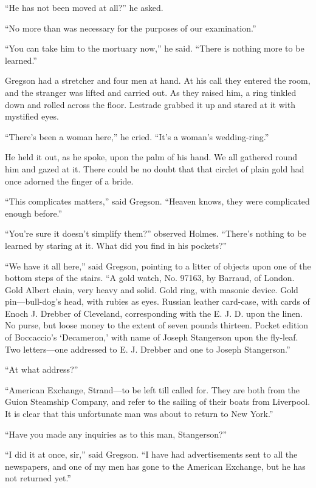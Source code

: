 \documentclass[12pt]{book}
\begin{document}
“He has not been moved at all?” he asked. 

“No more than was necessary for the purposes of our examination.” 

“You can take him to the mortuary now,” he said. “There is nothing more to be learned.” 

Gregson had a stretcher and four men at hand. At his call they entered the room, and the stranger was lifted and carried out. As they raised him, a ring tinkled down and rolled across the floor. Lestrade grabbed it up and stared at it with mystified eyes. 

“There’s been a woman here,” he cried. “It’s a woman’s wedding-ring.” 

He held it out, as he spoke, upon the palm of his hand. We all gathered round him and gazed at it. There could be no doubt that that circlet of plain gold had once adorned the finger of a bride. 

“This complicates matters,” said Gregson. “Heaven knows, they were complicated enough before.” 

“You’re sure it doesn’t simplify them?” observed Holmes. “There’s nothing to be learned by staring at it. What did you find in his pockets?” 

“We have it all here,” said Gregson, pointing to a litter of objects upon one of the bottom steps of the stairs. “A gold watch, No. 97163, by Barraud, of London. Gold Albert chain, very heavy and solid. Gold ring, with masonic device. Gold pin—bull-dog’s head, with rubies as eyes. Russian leather card-case, with cards of Enoch J. Drebber of Cleveland, corresponding with the E. J. D. upon the linen. No purse, but loose money to the extent of seven pounds thirteen. Pocket edition of Boccaccio’s ‘Decameron,’ with name of Joseph Stangerson upon the fly-leaf. Two letters—one addressed to E. J. Drebber and one to Joseph Stangerson.” 

“At what address?” 

“American Exchange, Strand—to be left till called for. They are both from the Guion Steamship Company, and refer to the sailing of their boats from Liverpool. It is clear that this unfortunate man was about to return to New York.” 

“Have you made any inquiries as to this man, Stangerson?” 

“I did it at once, sir,” said Gregson. “I have had advertisements sent to all the newspapers, and one of my men has gone to the American Exchange, but he has not returned yet.” 
\end{document}
